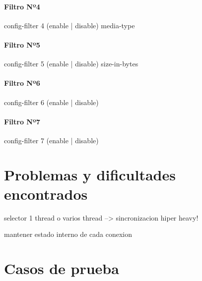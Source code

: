 \documentclass[a4paper,10pt]{article}
\begin{document}
            \paragraph*{Filtro Nº4}
            config-filter 4 (enable | disable) media-type

            \paragraph*{Filtro Nº5}
            config-filter 5 (enable | disable) size-in-bytes

            \paragraph*{Filtro Nº6}
            config-filter 6 (enable | disable)

            \paragraph*{Filtro Nº7}
            config-filter 7 (enable | disable)
\newpage
\section{Problemas y dificultades encontrados}

selector 1 thread  o varios thread --> sincronizacion hiper heavy!

mantener estado interno de cada conexion

\newpage
\section{Casos de prueba}
\end{document}
